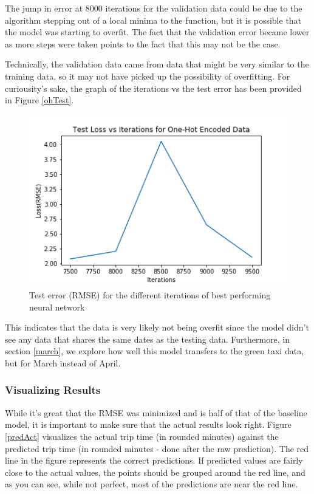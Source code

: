 \documentclass[conference]{IEEEtran}
\begin{document}
The jump in error at 8000 iterations for the validation data could be due to the algorithm stepping out of a local minima to the function, but it is possible that the model was starting to overfit.  The fact that the validation error became lower as more steps were taken points to the fact that this may not be the case.  

Technically, the validation data came from data that might be very similar to the training data, so it may not have picked up the possibility of overfitting.  For curiousity's sake, the graph of the iterations vs the test error has been provided in Figure \ref{ohTest}.

 \begin{figure}
  \centering
    \includegraphics[width=\linewidth]{reluOneHotAdamTestData.png}
      \caption{Test error (RMSE) for the different iterations of best performing neural network}
      \label{ohAcc}
\end{figure}

This indicates that the data is very likely not being overfit since the model didn't see any data that shares the same dates as the testing data.  Furthermore, in section \ref{march}, we explore how well this model transfers to the green taxi data, but for March instead of April.

\subsubsection{Visualizing Results}
While it's great that the RMSE was minimized and is half of that of the baseline model, it is important to make sure that the actual results look right.  Figure \ref{predAct} visualizes the actual trip time (in rounded minutes) against the predicted trip time (in rounded minutes - done after the raw prediction).  The red line in the figure represents the correct predictions.  If predicted values are fairly close to the actual values, the points should be grouped around the red line, and as you can see, while not perfect, most of the predictions are near the red line.
\end{document}
